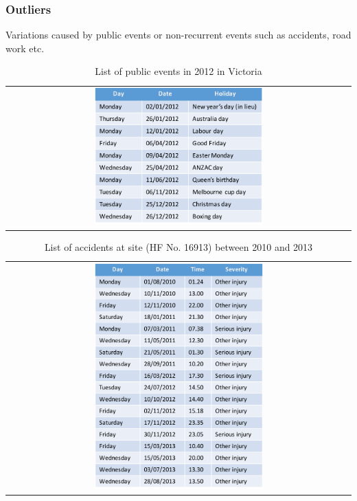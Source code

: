 \subsubsection{Outliers}

Variations caused by public events or non-recurrent events such as accidents, road work etc.

\begin{table}
    \centering
    \begin{tabular}{c}
        \includegraphics[width=0.5\textwidth,height=0.5\textheight,keepaspectratio]{Figures/holidays-2012.pdf}
    \end{tabular}
    \caption[List of public events in 2012 in Victoria]{List of public events in 2012 in Victoria}
    \label{table:publicEvents}
\end{table}

\begin{table}
    \centering
    \begin{tabular}{c}
        \includegraphics[width=0.5\textwidth,height=0.5\textheight,keepaspectratio]{Figures/accidents.pdf}
    \end{tabular}
    \caption[List of accidents at location]{List of accidents at site (HF No. 16913) between 2010 and
     2013}
    \label{table:accidents}
\end{table}

